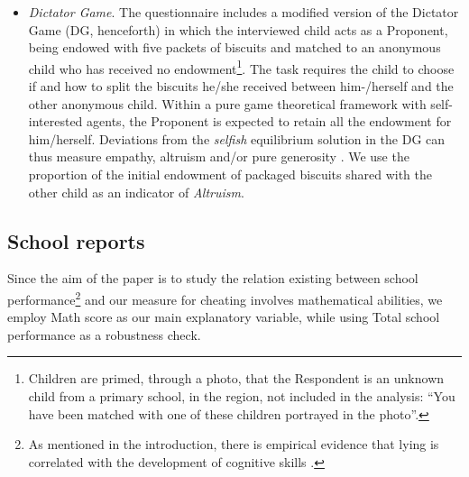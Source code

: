 \documentclass[authoryear, preprint, review, 12pt]{elsarticle}
\begin{document}
\begin{itemize}
\item \textit{Dictator Game}. The questionnaire includes a modified version of the Dictator Game (DG, henceforth) \citep{kahneman1986} in which the interviewed child acts as a Proponent, being endowed with five packets of biscuits and matched to an anonymous child who has received no endowment\footnote{Children are primed, through a photo, that the Respondent is an unknown child from a primary school, in the region, not included in the analysis: \enquote{You have been matched with one of these children portrayed in the photo}.}. The task requires the child to choose if and how to split the biscuits he/she received between him-/herself and the other anonymous child. Within a pure game theoretical framework with self-interested agents, the Proponent is expected to retain all the endowment for him/herself. Deviations from the \emph{selfish} equilibrium solution in the DG can thus measure empathy, altruism and/or pure generosity \citep{forsythe1994,camerer2003,guala2010paradigmatic}. We use the proportion of the initial endowment of packaged biscuits shared with the other child as an indicator of \textit{Altruism}.
\end{itemize}

\subsection{School reports}
\label{sub:schoolreport}
Since the aim of the paper is to study the relation existing between school performance\footnote{As mentioned in the introduction, there is empirical evidence that lying is correlated with the development of cognitive skills \citep{vasek1986lying,exl11,el13}.} and our measure for cheating involves mathematical abilities, we employ Math score as our main explanatory variable, while using Total school performance as a robustness check.
\end{document}

